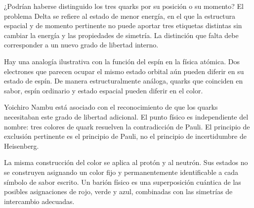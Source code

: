 ¿Podrían haberse distinguido los tres quarks por su posición o su momento? El problema Delta se refiere al estado de menor energía, en el que la estructura espacial y de momento pertinente no puede aportar tres etiquetas distintas sin cambiar la energía y las propiedades de simetría. La distinción que falta debe corresponder a un nuevo grado de libertad interno.

Hay una analogía ilustrativa con la función del espín en la física atómica. Dos electrones que parecen ocupar el mismo estado orbital aún pueden diferir en su estado de espín. De manera estructuralmente análoga, quarks que coinciden en sabor, espín ordinario y estado espacial pueden diferir en el color.


Yoichiro Nambu está asociado con el reconocimiento de que los quarks necesitaban este grado de libertad adicional. El punto físico es independiente del nombre: tres colores de quark resuelven la contradicción de Pauli. El principio de exclusión pertinente es el principio de Pauli, no el principio de incertidumbre de Heisenberg.


La misma construcción del color se aplica al protón y al neutrón. Sus estados no se construyen asignando un color fijo y permanentemente identificable a cada símbolo de sabor escrito. Un barión físico es una superposición cuántica de las posibles asignaciones de rojo, verde y azul, combinadas con las simetrías de intercambio adecuadas.

\begin{classroomqa}
\end{classroomqa}

